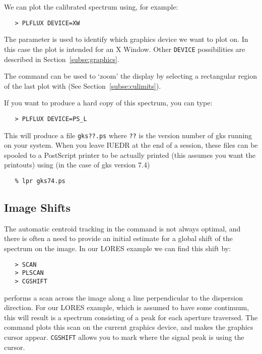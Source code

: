 We can plot the calibrated spectrum using, for example:

\begin{verbatim}
   > PLFLUX DEVICE=XW
\end{verbatim}

The  parameter is used to identify which graphics device we want
to plot on.  In this case the plot is intended for an X Window.  Other
\verb+DEVICE+ possibilities are described in Section~\ref{subse:graphics}\@.

The  command can be used to `zoom' the display by selecting a
rectangular region of the last plot with  (See
Section~\ref{subse:culimits})\@.

If you want to produce a hard copy of this spectrum, you can type:

\begin{verbatim}
   > PLFLUX DEVICE=PS_L
\end{verbatim}

This will produce a file \verb+gks??.ps+ where \verb+??+ is the version number
of gks running on your system.
When you leave IUEDR at the end of a session, these files can be spooled to a
PostScript printer to be actually printed (this assumes you want the
printouts) using (in the case of gks version 7.4)

\begin{verbatim}
   % lpr gks74.ps
\end{verbatim}


\subsection{Image Shifts}

The automatic centroid tracking in the  command is not always
optimal, and there is often a need to provide an initial estimate for a global
shift of the spectrum on the image.  In our LORES example we can find this shift
by:

\begin{verbatim}
   > SCAN
   > PLSCAN
   > CGSHIFT
\end{verbatim}

performs a scan across the image along a line perpendicular to the
dispersion direction.  For our LORES example, which is assumed to have some
continuum, this will result is a spectrum consisting of a peak for each
aperture traversed.  The 
 command plots this scan on the current
graphics device, and 
 makes the graphics cursor appear.
\verb+CGSHIFT+ allows you to mark where the signal peak is using the cursor.

